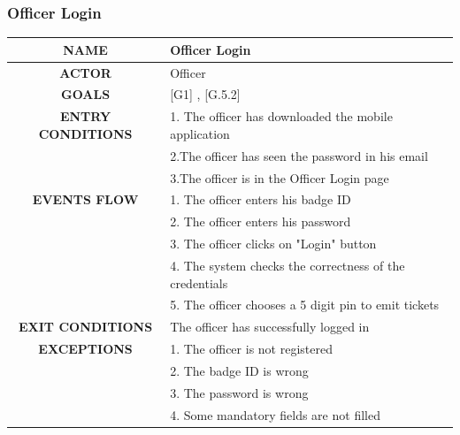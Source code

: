 \documentclass[12pt,a4paper]{article}
\begin{document}
\subsubsection{Officer Login}
		\begin{center}
			\begin{tabular}{| c | l |}
				\hline
				\textbf{NAME} & Officer Login \\
				\hline
				\textbf{ACTOR} & Officer \\
				\hline
				\textbf{GOALS} & [G1] , [G.5.2] \\
				\hline
				\textbf{ENTRY CONDITIONS} &1. The officer has downloaded the mobile application \\
				&2.The officer has seen the password in his email\\
				&3.The officer is in the Officer Login page \\ \hline
				\textbf{EVENTS FLOW}  &
				1. The officer enters his badge ID\\
				&2. The officer enters his password\\
				&3. The officer clicks on "Login" button\\
				&4. The system checks the correctness of the credentials\\
				&5. The officer chooses a 5 digit pin to emit tickets \\ \hline
				\textbf{EXIT CONDITIONS}  & The officer has successfully logged in \\ \hline
				\textbf{EXCEPTIONS} &
				1. The officer is not registered\\
				&2. The badge ID is wrong\\
				&3. The password is wrong\\
				&4. Some mandatory fields are not filled\\
				\hline
			\end{tabular}
		\end{center}
\end{document}
